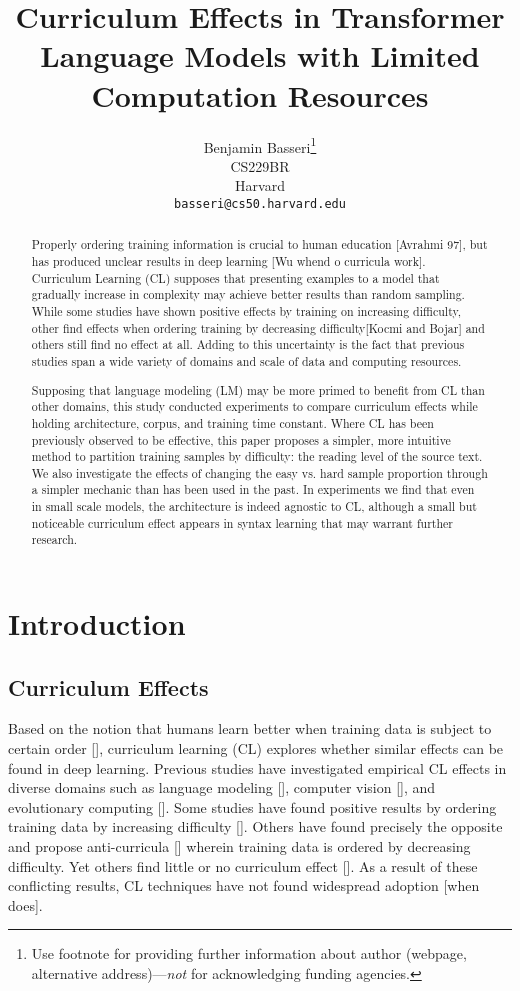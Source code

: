 \documentclass{article}
\title{Curriculum Effects in Transformer Language Models with Limited Computation Resources}
\author{%
  Benjamin Basseri\thanks{Use footnote for providing further information
    about author (webpage, alternative address)---\emph{not} for acknowledging
    funding agencies.} \\
  CS229BR\\
  Harvard\\
  \texttt{basseri@cs50.harvard.edu} \\
}
\begin{document}
\maketitle

\begin{abstract}
Properly ordering training information is crucial to human education [Avrahmi 97], but has produced unclear results in deep learning [Wu whend o curricula work].  Curriculum Learning (CL) supposes that presenting examples to a model that gradually increase in complexity may achieve better results than random sampling. While some studies have shown positive effects by training on increasing difficulty, other find effects when ordering training by decreasing difficulty[Kocmi and Bojar] and others still find no effect at all. Adding to this uncertainty is the fact that previous studies span a wide variety of domains and scale of data and computing resources. 

Supposing that language modeling (LM) may be more primed to benefit from CL than other domains, this study conducted experiments to compare curriculum effects while holding architecture, corpus, and training time constant. Where CL has been previously observed to be effective, this paper proposes a simpler, more intuitive method to partition training samples by difficulty: the reading level of the source text. We also investigate the effects of changing the easy vs. hard sample proportion through a simpler mechanic than has been used in the past. In experiments we find that even in small scale models, the architecture is indeed agnostic to CL, although a small but noticeable curriculum effect appears in syntax learning that may warrant further research.

\end{abstract}

\section{Introduction}

\subsection{Curriculum Effects}

Based on the notion that humans learn better when training data is subject to certain order [], curriculum learning (CL) explores whether similar effects can be found in deep learning. Previous studies have investigated empirical CL effects in diverse domains such as language modeling [], computer vision [], and evolutionary computing []. Some studies have found positive results by ordering training data by increasing difficulty [].  Others have found precisely the opposite and propose anti-curricula [] wherein training data is ordered by decreasing difficulty. Yet others find little or no curriculum effect []. As a result of these conflicting results, CL techniques have not found widespread adoption [when does].
\end{document}
